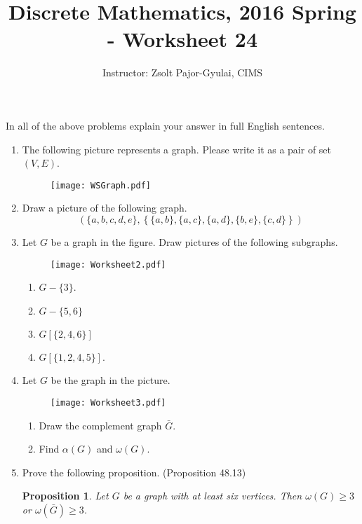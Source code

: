 \documentclass[11pt]{preprint}
\title{Discrete Mathematics, 2016 Spring - Worksheet 24}
\author{Instructor: Zsolt Pajor-Gyulai, CIMS}
\def\enumb{\begin{enumerate}}
\def\enume{\end{enumerate}}
\newtheorem{proposition}{Proposition}
\begin{document}
\maketitle

In all of the above problems explain your answer in full English sentences.

\enumb
\item The following picture represents a graph. Please write it as a pair of set $(V,E)$.
\begin{figure}[ht]
\centering
\texttt{[image: WSGraph.pdf]}
\end{figure}\vspace{-0.6cm}
\item Draw a picture of the following graph.
\[
\left(\{a,b,c,d,e\},\left\{\{a,b\},\{a,c\},\{a,d\},\{b,e\},\{c,d\}\right\}\right)
\]
\item Let $G$ be a graph in the figure. Draw pictures of the following subgraphs.

\begin{figure}[ht]
\centering
\texttt{[image: Worksheet2.pdf]}
\end{figure}\vspace{-0.9cm}
\enumb
\item $G-\{3\}$.
\item $G-\{5,6\}$
\item $G[\{2,4,6\}]$
\item $G[\{1,2,4,5\}]$.
\enume
\item Let $G$ be the graph in the picture.
\begin{figure}[ht]
\centering
\texttt{[image: Worksheet3.pdf]}
\end{figure}
\enumb
\item Draw the complement graph $\bar{G}$.
\item Find $\alpha(G)$ and $\omega(G)$.
\enume\newpage
\item Prove the following proposition. (Proposition 48.13)
\begin{proposition}
Let $G$ be a graph with at least six vertices. Then $\omega(G)\geq 3$ or $\omega(\bar{G})\geq 3$.
\end{proposition}
\enume
\end{document}
